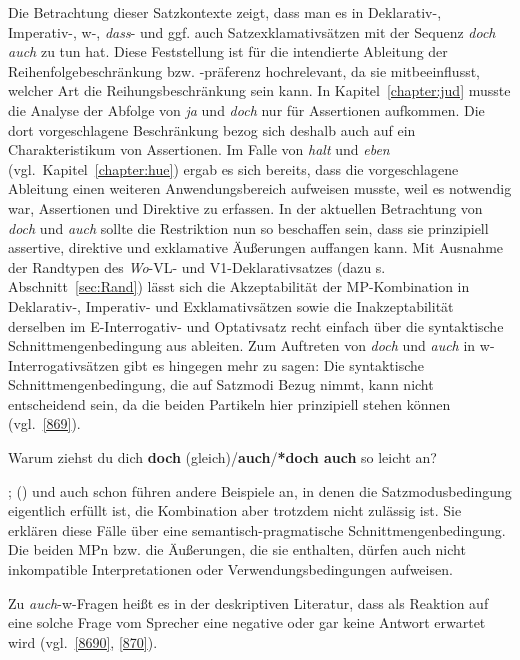 {Die Betrachtung dieser Satzkontexte zeigt, dass man es in Deklarativ-, Impera\-tiv-, w-, \textit{dass}- und ggf. auch Satzexklamativsätzen mit der Sequenz \textit{doch auch} zu tun hat. Diese Feststellung ist für die intendierte Ableitung der Reihenfolgebe\-schränkung bzw. -präferenz hochrelevant, da sie mitbeeinflusst, welcher Art die Reihungsbeschränkung sein kann. In Kapitel~\ref{chapter:jud} musste die Analyse der Abfolge von \textit{ja} und \textit{doch} nur für Assertionen aufkommen. Die dort vorgeschlagene Beschränkung bezog sich deshalb auch auf ein Charakteristikum von Assertionen. Im Falle von \textit{halt} und \textit{eben} (vgl.\ Kapitel~\ref{chapter:hue}) ergab es sich bereits, dass die vorgeschlagene Ableitung einen weiteren Anwendungsbereich aufweisen musste, weil es notwen\-dig war, Assertionen und Direktive zu erfassen. In der aktuellen Betrachtung von \textit{doch} und \textit{auch} sollte die Restriktion nun so beschaffen sein, dass sie prinzipiell assertive, direktive und exklamative Äußerungen auffangen kann. Mit Ausnahme der Randtypen des  \textit{Wo}-VL- und V1-Deklarativsatzes  (dazu s. Abschnitt~\ref{sec:Rand}) lässt sich die Akzeptabilität der MP-Kombination in \mbox{Deklarativ-,} Impe\-rativ- und Ex\-klamativsätzen sowie die Inakzeptabilität derselben im E-Inter\-rogativ- und Optativsatz recht einfach über die syntaktische Schnittmengenbedingung aus \citet{Thurmair1989, Thurmair1991} ableiten. Zum Auftreten von \textit{doch} und \textit{auch} in w-Interroga\-tivsätzen gibt es hingegen mehr zu sagen: Die syntaktische Schnittmengenbedingung, die auf Satzmodi Bezug nimmt, kann nicht entscheidend sein, da die beiden Partikeln hier prinzipiell stehen können (vgl.\ \ref{869}).

\begin{exe}
\ex\label{869}
Warum ziehst du dich \textbf{doch} (gleich)/\textbf{auch}/\textbf{*doch auch} so leicht an?
\end{exe}	
\citet[281]{Thurmair1989}; (\citeyear[27]{Thurmair1991}) und auch schon \citet[218, 222, 224--225]{Dahl1988} führen andere Beispiele an, in denen die Satzmodusbedingung eigentlich erfüllt ist, die Kombination aber trotzdem nicht zulässig ist. Sie erklären diese Fälle über eine semantisch-pragmatische Schnittmengenbedingung. Die beiden MPn bzw. die Äußerungen, die sie enthalten, dürfen auch nicht inkompatible Interpretationen oder Verwendungsbedingungen aufweisen. 	
	
Zu \textit{auch}-w-Fragen heißt es in der deskriptiven Literatur, dass als Reaktion auf eine solche Frage vom Sprecher eine negative oder gar keine Antwort erwartet wird (vgl.\ \ref{8690}, \ref{870}). 

}
